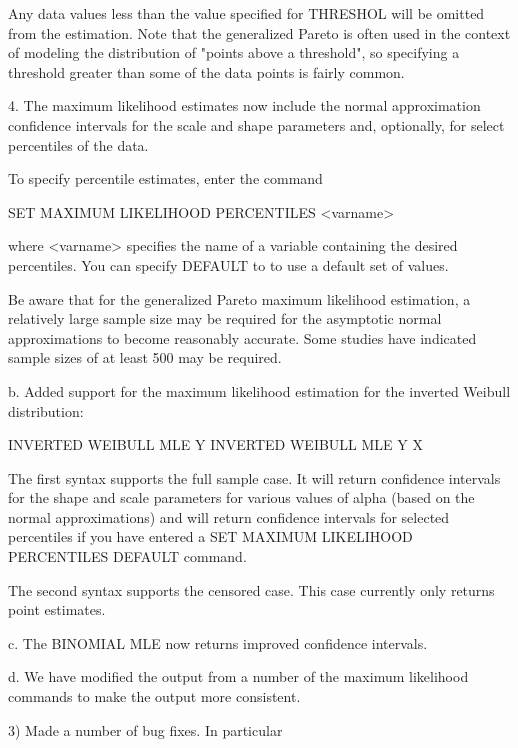 {          Any data values less than the value specified for
          THRESHOL will be omitted from the estimation.  Note that
          the generalized Pareto is often used in the context of
          modeling the distribution of "points above a threshold",
          so specifying a threshold greater than some of the data
          points is fairly common.

       4. The maximum likelihood estimates now include the normal
          approximation confidence intervals for the scale and
          shape parameters and, optionally, for select percentiles
          of the data.

          To specify percentile estimates, enter the command

               SET MAXIMUM LIKELIHOOD PERCENTILES  <varname>

          where <varname> specifies the name of a variable containing
          the desired percentiles.  You can specify DEFAULT to
          to use a default set of values.

          Be aware that for the generalized Pareto maximum
          likelihood estimation, a relatively large sample size
          may be required for the asymptotic normal approximations
          to become reasonably accurate.  Some studies have
          indicated sample sizes of at least 500 may be required.

    b. Added support for the maximum likelihood estimation for
       the inverted Weibull distribution:

           INVERTED WEIBULL MLE Y
           INVERTED WEIBULL MLE Y X

       The first syntax supports the full sample case.  It will
       return confidence intervals for the shape and scale
       parameters for various values of alpha (based on the
       normal approximations) and will return confidence intervals
       for selected percentiles if you have entered a
       SET MAXIMUM LIKELIHOOD PERCENTILES DEFAULT command.

       The second syntax supports the censored case.  This case
       currently only returns point estimates.

    c. The BINOMIAL MLE now returns improved confidence intervals.

    d. We have modified the output from a number of the maximum
       likelihood commands to make the output more consistent.

 3) Made a number of bug fixes.  In particular

}
